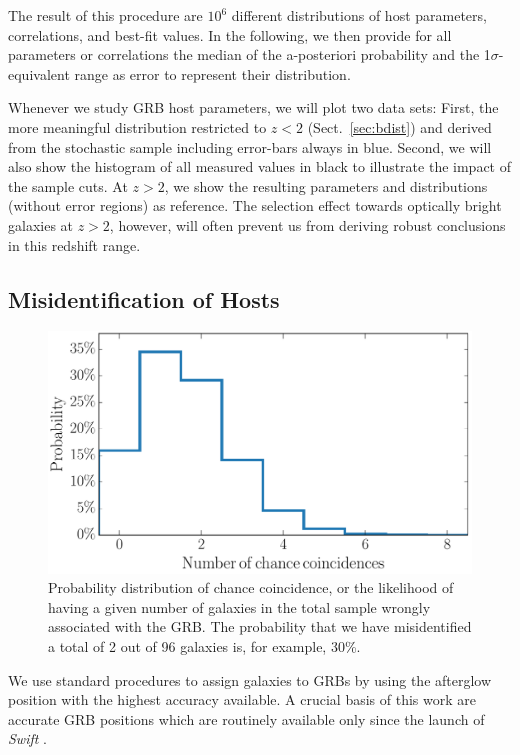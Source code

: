 \documentclass[traditabstract, longauth]{aa}
\begin{document}
 {The result of this procedure are $10^{6}$ different distributions of host parameters, correlations, and best-fit values. In the following, we then provide for all parameters or correlations the median of the a-posteriori probability and the 1$\sigma$-equivalent range as error to represent their distribution.}

 {Whenever we study GRB host parameters, we will plot two data sets: First, the more meaningful distribution restricted to $z<2$ (Sect.~\ref{sec:bdist}) and derived from the stochastic sample including error-bars always in blue. Second, we will also show the histogram of all measured values in black to illustrate the impact of the sample cuts. At $z>2$, we show the resulting parameters and distributions (without error regions) as reference. The selection effect towards optically bright galaxies at $z>2$, however, will often prevent us from deriving robust conclusions in this redshift range.}

\subsection{Misidentification of Hosts}

\begin{figure}
\includegraphics[angle=0, width=0.99\columnwidth]{Figs/Misidentifications.pdf}
\caption{Probability distribution of chance coincidence, or the likelihood of having a given number of galaxies in the total sample wrongly associated with the GRB. The probability that we have misidentified a total of 2 out of 96 galaxies is, for example, 30\%.}
\label{fig:misid}
\end{figure}

We use standard procedures \citep{2002AJ....123.1111B, 2009AJ....138.1690P} to assign galaxies to GRBs by using the afterglow position with the highest accuracy available. A crucial basis of this work are accurate GRB positions which are routinely available only since the launch of \textit{Swift} \citep{2004ApJ...611.1005G, 2005SSRv..120..165B}. 
\end{document}
